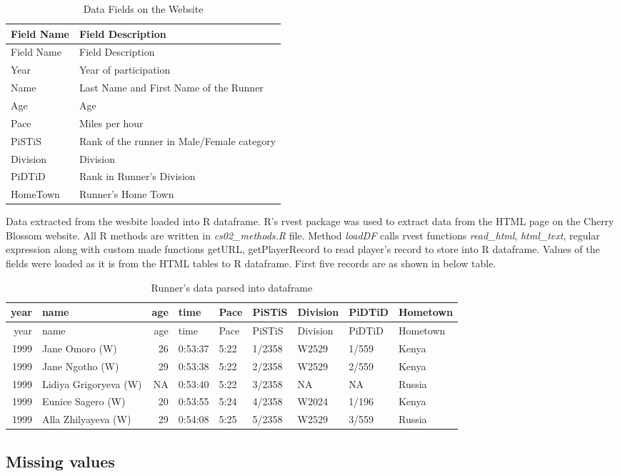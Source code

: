 \documentclass[
]{article}
\begin{document}
\begin{longtable}[]{@{}ll@{}}
\caption{Data Fields on the Website}\tabularnewline
\toprule
Field Name & Field Description\tabularnewline
\midrule
\endfirsthead
\toprule
Field Name & Field Description\tabularnewline
\midrule
\endhead
Year & Year of participation\tabularnewline
Name & Last Name and First Name of the Runner\tabularnewline
Age & Age\tabularnewline
Pace & Miles per hour\tabularnewline
PiSTiS & Rank of the runner in Male/Female category\tabularnewline
Division & Division\tabularnewline
PiDTiD & Rank in Runner's Division\tabularnewline
HomeTown & Runner's Home Town\tabularnewline
\bottomrule
\end{longtable}

Data extracted from the wesbite loaded into R dataframe. R's rvest
package was used to extract data from the HTML page on the Cherry
Blossom website. All R methods are written in \emph{cs02\_methods.R}
file. Method \emph{loadDF} calls rvest functions \emph{read\_html},
\emph{html\_text}, regular expression along with custom made functions
getURL, getPlayerRecord to read player's record to store into R
dataframe. Values of the fields were loaded as it is from the HTML
tables to R dataframe. First five records are as shown in below table.

\begin{longtable}[]{@{}rlrllllll@{}}
\caption{Runner's data parsed into dataframe}\tabularnewline
\toprule
year & name & age & time & Pace & PiSTiS & Division & PiDTiD &
Hometown\tabularnewline
\midrule
\endfirsthead
\toprule
year & name & age & time & Pace & PiSTiS & Division & PiDTiD &
Hometown\tabularnewline
\midrule
\endhead
1999 & Jane Omoro (W) & 26 & 0:53:37 & 5:22 & 1/2358 & W2529 & 1/559 &
Kenya\tabularnewline
1999 & Jane Ngotho (W) & 29 & 0:53:38 & 5:22 & 2/2358 & W2529 & 2/559 &
Kenya\tabularnewline
1999 & Lidiya Grigoryeva (W) & NA & 0:53:40 & 5:22 & 3/2358 & NA & NA &
Russia\tabularnewline
1999 & Eunice Sagero (W) & 20 & 0:53:55 & 5:24 & 4/2358 & W2024 & 1/196
& Kenya\tabularnewline
1999 & Alla Zhilyayeva (W) & 29 & 0:54:08 & 5:25 & 5/2358 & W2529 &
3/559 & Russia\tabularnewline
\bottomrule
\end{longtable}

\hypertarget{missing-values}{%
\subsection{Missing values}\label{missing-values}}
\end{document}
